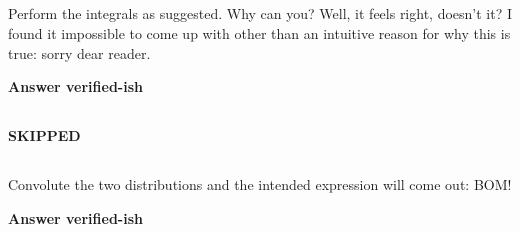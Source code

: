 \subsection{}
Perform the integrals as suggested.  Why can you?  Well, it feels right, doesn't it?  I found it impossible to come up with other than an intuitive reason for why this is true: sorry dear reader.

\textbf{Answer verified-ish}

\subsection{}

\textbf{SKIPPED}


\subsection{}
Convolute the two distributions and the intended expression will come out: BOM!

\textbf{Answer verified-ish}

%
%
%	





